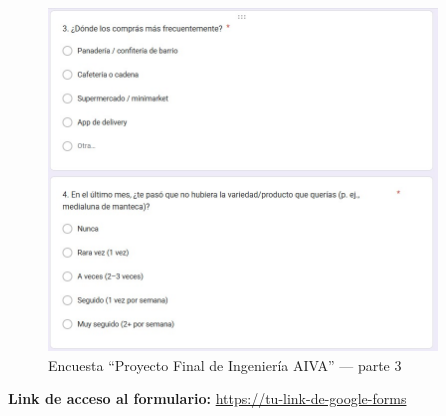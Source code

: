 \begin{figure}[p]
  \centering
  \includegraphics[width=0.92\textwidth]{images/encuesta_p3.png} %
  \caption{Encuesta “Proyecto Final de Ingeniería AIVA” — parte 3}
  \label{fig:encuesta-aiva-3}
\end{figure}

\noindent\textbf{Link de acceso al formulario:}
\url{https://tu-link-de-google-forms} %
\bigskip